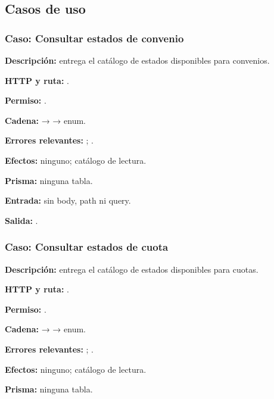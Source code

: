 \subsection{Casos de uso}


\subsubsection{Caso: Consultar estados de convenio}


\textbf{Descripción:} entrega el catálogo de estados disponibles para convenios.  

\textbf{HTTP y ruta:} \texttt{}.  

\textbf{Permiso:} \texttt{}.  

\textbf{Cadena:} \texttt{} → \texttt{} → enum.  

\textbf{Errores relevantes:} \texttt{}; \texttt{}.  

\textbf{Efectos:} ninguno; catálogo de lectura.  

\textbf{Prisma:} ninguna tabla.  

\textbf{Entrada:} sin body, path ni query.  

\textbf{Salida:} \texttt{}.


\subsubsection{Caso: Consultar estados de cuota}


\textbf{Descripción:} entrega el catálogo de estados disponibles para cuotas.  

\textbf{HTTP y ruta:} \texttt{}.  

\textbf{Permiso:} \texttt{}.  

\textbf{Cadena:} \texttt{} → \texttt{} → enum.  

\textbf{Errores relevantes:} \texttt{}; \texttt{}.  

\textbf{Efectos:} ninguno; catálogo de lectura.  

\textbf{Prisma:} ninguna tabla.  

